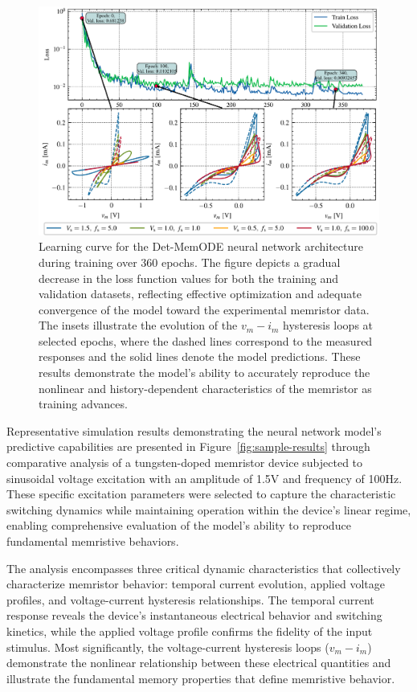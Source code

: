 \documentclass[lettersize,journal]{IEEEtran}
\begin{document}
\begin{figure}[!t]
  \centering
  \includegraphics[width=\linewidth]{figs/Training_process.pdf}
  \caption{Learning curve for the Det-MemODE neural network architecture during training over 360 epochs. The figure depicts a gradual decrease in the loss function values for both the training and validation datasets, reflecting effective optimization and adequate convergence of the model toward the experimental memristor data. The insets illustrate the evolution of the \( v_m - i_m \) hysteresis loops at selected epochs, where the dashed lines correspond to the measured responses and the solid lines denote the model predictions. These results demonstrate the model’s ability to accurately reproduce the nonlinear and history-dependent characteristics of the memristor as training advances.}
  \label{fig:learning-curve}
\end{figure}



Representative simulation results demonstrating the neural network model's predictive capabilities are presented in Figure~\ref{fig:sample-results} through comparative analysis of a tungsten-doped memristor device subjected to sinusoidal voltage excitation with an amplitude of 1.5V and frequency of 100Hz. These specific excitation parameters were selected to capture the characteristic switching dynamics while maintaining operation within the device's linear regime, enabling comprehensive evaluation of the model's ability to reproduce fundamental memristive behaviors.

The analysis encompasses three critical dynamic characteristics that collectively characterize memristor behavior: temporal current evolution, applied voltage profiles, and voltage-current hysteresis relationships. The temporal current response reveals the device's instantaneous electrical behavior and switching kinetics, while the applied voltage profile confirms the fidelity of the input stimulus. Most significantly, the voltage-current hysteresis loops (\(v_m - i_m\)) demonstrate the nonlinear relationship between these electrical quantities and illustrate the fundamental memory properties that define memristive behavior.
\end{document}
